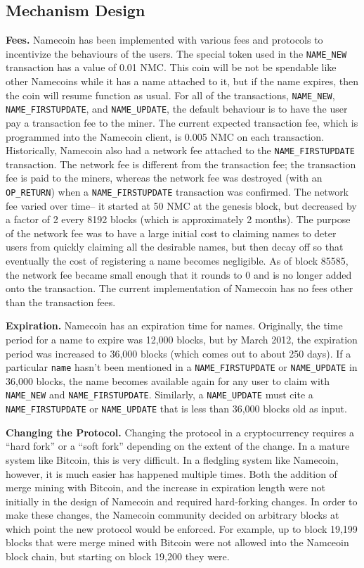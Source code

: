 \subsection{Mechanism Design}


{\bf Fees.}
Namecoin has been implemented with various fees and protocols to incentivize the behaviours of the users. The special token used in the {\tt NAME\_NEW} transaction has a value of 0.01 NMC. This coin will be not be spendable like other Namecoins while it has a name attached to it, but if the name expires, then the coin will resume function as usual. For all of the transactions, {\tt NAME\_NEW}, {\tt NAME\_FIRSTUPDATE}, and {\tt NAME\_UPDATE}, the default behaviour is to have the user pay a transaction fee to the miner. The current expected transaction fee, which is programmed into the Namecoin client, is 0.005 NMC on each transaction. Historically, Namecoin also had a network fee attached to the {\tt NAME\_FIRSTUPDATE} transaction. The network fee is different from the transaction fee; the transaction fee is paid to the miners, whereas the network fee was destroyed (with an {\tt OP\_RETURN}) when a {\tt NAME\_FIRSTUPDATE} transaction was confirmed. The network fee varied over time-- it started at 50 NMC at the genesis block, but decreased by a factor of 2 every 8192 blocks (which is approximately 2 months). The purpose of the network fee was to have a large initial cost to claiming names to deter users from quickly claiming all the desirable names, but then decay off so that eventually the cost of registering a name becomes negligible. As of block 85585, the network fee became small enough that it rounds to 0 and is no longer added onto the transaction. The current implementation of Namecoin has no fees other than the transaction fees.

{\bf Expiration.}
Namecoin has an expiration time for names. Originally, the time period for a name to expire was 12,000 blocks, but by March 2012, the expiration period was increased to 36,000 blocks (which comes out to about 250 days). If a particular {\tt name} hasn't been mentioned in a {\tt NAME\_FIRSTUPDATE} or {\tt NAME\_UPDATE} in 36,000 blocks, the name becomes available again for any user to claim with {\tt NAME\_NEW} and {\tt NAME\_FIRSTUPDATE}. Similarly, a {\tt NAME\_UPDATE} must cite a {\tt NAME\_FIRSTUPDATE} or {\tt NAME\_UPDATE} that is less than 36,000 blocks old as input.

{\bf Changing the Protocol.}
Changing the protocol in a cryptocurrency requires a ``hard fork'' or a ``soft fork'' depending on the extent of the change. In a mature system like Bitcoin, this is very difficult. In a fledgling system like Namecoin, however, it is much easier has happened multiple times. Both the addition of merge mining with Bitcoin, and the increase in expiration length were not initially in the design of Namecoin and required hard-forking changes. In order to make these changes, the Namecoin community decided on arbitrary blocks at which point the new protocol would be enforced. For example, up to block 19,199 blocks that were merge mined with Bitcoin were not allowed into the Namceoin block chain, but starting on block 19,200 they were. 
 
